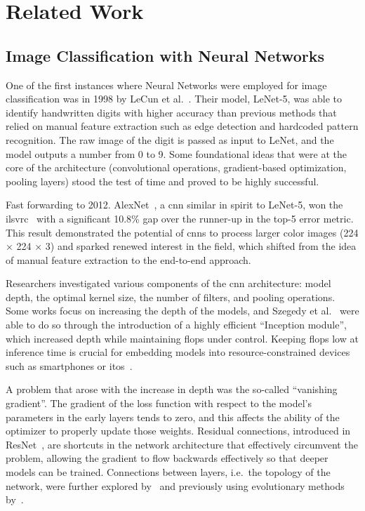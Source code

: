 \chapter{Related Work}
\label{ch:related-work}

\section{Image Classification with Neural Networks}
\label{sec:image-classification-with-neural-networks}

One of the first instances where Neural Networks were employed for image
classification was in 1998 by LeCun et al.~\cite{GradientBasedLecun1998}. Their
model, LeNet-5, was able to identify handwritten digits with higher accuracy
than previous methods that relied on manual feature extraction such as edge
detection and hardcoded pattern recognition. The raw image of the digit is %
passed as input to LeNet, and the model outputs a number from 0 to 9. Some
foundational ideas that were at the core of the architecture (convolutional
operations, gradient-based optimization, pooling layers) stood the test of time
and proved to be highly successful.

Fast forwarding to 2012. AlexNet~\cite{ImagenetClassiKrizhe2017}, a
\acrfull{cnn} similar in spirit to LeNet-5, won the
\acrfull{ilsvrc}~\cite{ImagenetLargeRussak2014} with a significant 10.8\% gap
over the runner-up in the top-5 error metric. This result demonstrated the
potential of \acrshort{cnn}s to process larger color images (224 × 224 × 3) and
sparked renewed interest in the field, which shifted from the idea of manual
feature extraction to the end-to-end approach.

Researchers investigated various components of the \acrshort{cnn} architecture:
model depth, the optimal kernel size, the number of filters, and pooling
operations. Some works \cite{VeryDeepConvoSimony2014, GoingDeeperWiSzeged2014}
focus on increasing the depth of the models, and Szegedy et
al.~\cite{GoingDeeperWiSzeged2014} were able to do so through the introduction
of a highly efficient ``Inception module'', which increased depth while
maintaining \acrfull{flops} under control. Keeping \acrshort{flops} low at
inference time is crucial for embedding models into resource-constrained
devices such as smartphones or \acrfull{itos}~\cite{SqueezenetAleIandol2016,
MnasnetPlatfoTanM2018, MobilenetsEffHoward2017}.

A problem that arose with the increase in depth was the so-called ``vanishing
gradient''. The gradient of the loss function with respect to the model's
parameters in the early layers tends to zero, and this affects the ability of
the optimizer to properly update those weights. Residual connections,
introduced in ResNet~\cite{DeepResidualLHeKa2015, IdentityMappinHeKa2016}, are
shortcuts in the network architecture that effectively circumvent the problem,
allowing the gradient to flow backwards effectively so that deeper models can
be trained. Connections between layers, i.e.\ the topology of the network, were %
further explored by~\cite{DualPathNetwoChen2017, DenselyConnectHuang2016} and
previously using evolutionary methods by~\cite{DesigningNeuraMiller1989,
EvolvingNeuralStanle2002}.

